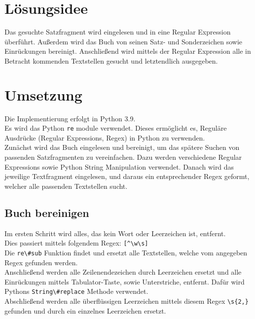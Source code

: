 \maketitle
\tableofcontents

\vspace{0.5cm}


\section{Lösungsidee}\label{sec:losungsidee}
Das gesuchte Satzfragment wird eingelesen und in eine Regular Expression überführt.
Außerdem wird das Buch von seinen Satz- und Sonderzeichen sowie Einrückungen bereinigt.
Anschließend wird mittels der Regular Expression alle in Betracht kommenden Textstellen gesucht
und letztendlich ausgegeben.


\section{Umsetzung}\label{sec:umsetzung}
Die Implementierung erfolgt in Python 3.9. \\
Es wird das Python \verb/re/ module verwendet.
Dieses ermöglicht es, Reguläre Ausdrücke (Regular Expressions, Regex) in Python zu verwenden. \\
Zunächst wird das Buch eingelesen und bereinigt, um das spätere Suchen von passenden Satzfragmenten zu vereinfachen.
Dazu werden verschiedene Regular Expressions sowie Python String Manipulation verwendet.
Danach wird das jeweilige Textfragment eingelesen, und daraus ein entsprechender Regex geformt, welcher
alle passenden Textstellen sucht.

\subsection{Buch bereinigen}\label{subsec:buch-bereinigen}
Im ersten Schritt wird alles, das kein Wort oder Leerzeichen ist, entfernt. \\
Dies passiert mittels folgendem Regex: \verb/[^\w\s]/ \\
Die \verb/re\#sub/ Funktion findet und ersetzt alle Textstellen, welche vom angegeben Regex gefunden werden. \\
Anschließend werden alle Zeilenendezeichen durch Leerzeichen ersetzt und
alle Einrückungen mittels Tabulator-Taste, sowie Unterstriche, entfernt.
Dafür wird Pythons \verb/String\#replace/ Methode verwendet.\\
Abschließend werden alle überflüssigen Leerzeichen mittels diesem Regex \verb/\s{2,}/ gefunden
und durch ein einzelnes Leerzeichen ersetzt.

